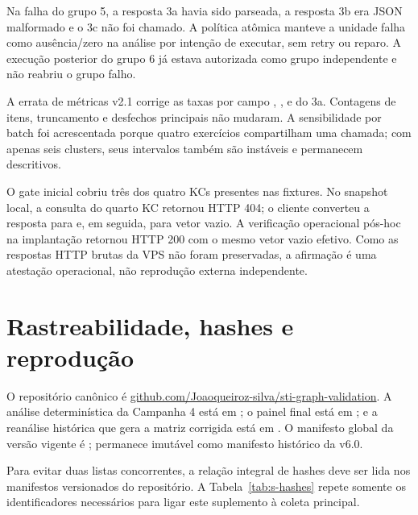 \documentclass[11pt,a4paper]{article}
\begin{document}
Na falha do grupo 5, a resposta 3a havia sido parseada, a resposta 3b era JSON malformado e o 3c não foi chamado. A política atômica manteve a unidade falha como ausência/zero na análise por intenção de executar, sem retry ou reparo. A execução posterior do grupo 6 já estava autorizada como grupo independente e não reabriu o grupo falho.

A errata de métricas v2.1 corrige as taxas por campo , ,  e  do 3a. Contagens de itens, truncamento e desfechos principais não mudaram. A sensibilidade por batch foi acrescentada porque quatro exercícios compartilham uma chamada; com apenas seis clusters, seus intervalos também são instáveis e permanecem descritivos.

O gate inicial cobriu três dos quatro KCs presentes nas fixtures. No snapshot local, a consulta do quarto KC retornou HTTP 404; o cliente converteu a resposta para  e, em seguida, para vetor vazio. A verificação operacional pós-hoc na implantação retornou HTTP 200 com o mesmo vetor vazio efetivo. Como as respostas HTTP brutas da VPS não foram preservadas, a afirmação é uma atestação operacional, não reprodução externa independente.

\section{Rastreabilidade, hashes e reprodução}

O repositório canônico é \href{https://github.com/Joaoqueiroz-silva/sti-graph-validation}{github.com/Joaoqueiroz-silva/sti-graph-validation}. A análise determinística da Campanha 4 está em ; o painel final está em ; e a reanálise histórica que gera a matriz corrigida está em . O manifesto global da versão vigente é ;  permanece imutável como manifesto histórico da v6.0.

Para evitar duas listas concorrentes, a relação integral de hashes deve ser lida nos manifestos versionados do repositório. A Tabela~\ref{tab:s-hashes} repete somente os identificadores necessários para ligar este suplemento à coleta principal.
\end{document}
